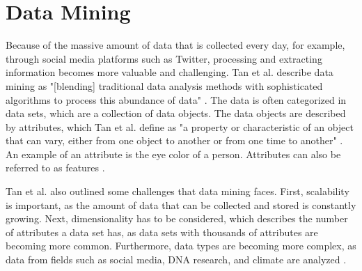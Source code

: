 \section{Data Mining}
Because of the massive amount of data that is collected every day, for example, through social media platforms such as Twitter, processing and extracting information becomes more valuable and challenging. Tan et al. describe data mining as "[blending] traditional data analysis methods with sophisticated algorithms to process this abundance of data" \cite[p.~21]{DBLP:books/aw/TanSKK2019}. The data is often categorized in data sets, which are a collection of data objects. The data objects are described by attributes, which Tan et al. define as "a property or characteristic of an object that can vary, either from one object to another or from one time to another" \cite[p.~47]{DBLP:books/aw/TanSKK2019}. An example of an attribute is the eye color of a person. Attributes can also be referred to as features \cite{DBLP:books/aw/TanSKK2019}.


Tan et al. also outlined some challenges that data mining faces. First, scalability is important, as the amount of data that can be collected and stored is constantly growing. Next, dimensionality has to be considered, which describes the number of attributes a data set has, as data sets with thousands of attributes are becoming more common. Furthermore, data types are becoming more complex, as data from fields such as social media, DNA research, and climate are analyzed \cite{DBLP:books/aw/TanSKK2019}.


